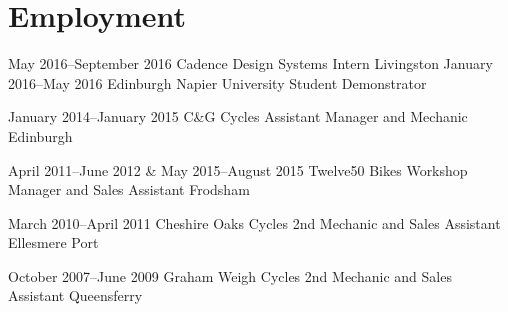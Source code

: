 \documentclass{moderncv}
\begin{document}
\section{Employment}
	\cventry
		{}
		{May 2016--September 2016}
		{Cadence Design Systems}
		{Intern}
		{Livingston}
		{
		}
	\cventry
		{}
		{January 2016--May 2016}
		{Edinburgh Napier University}
		{Student Demonstrator}
		{}
		{}
		\begin{comment}

			\cvlistitem{2nd year Mobile Applications Development}
			\cvlistitem{Assisting lecturer during practical sessions}
			\cvlistitem{Answering questions from students related to mobile programming}
			\cvlistitem{Presented during lecture on previous year's coursework}
		}
		\end{comment}
	\cventry
		{}
		{January 2014--January 2015}
		{C\&G Cycles}
		{Assistant Manager and Mechanic}
		{Edinburgh}
		{}
		\begin{comment}
			\cvlistitem{Assembling high end custom road bikes}
			\cvlistitem{Setting up, updating, and customising electronic gear systems}
			\cvlistitem{Attending trade shows and manufacturers events}
		\end{comment}
	\cventry
		{}
		{April 2011--June 2012 \& May 2015--August 2015}
		{Twelve50 Bikes}
		{Workshop Manager and Sales Assistant}
		{Frodsham}
		{}
		\begin{comment}
			\cvlistitem{Repairs}
			\cvlistitem{New builds}
			\cvlistitem{Assembling high end custom road and mountain bikes}
			\cvlistitem{Maintaining stock of workshop supplies}
			\cvlistitem{Assembling and maintaining race bike fleet}
			\cvlistitem{All aspects of sales}
		\end{comment}
	\cventry
		{}
		{March 2010--April 2011}
		{Cheshire Oaks Cycles}
		{2nd Mechanic and Sales Assistant}
		{Ellesmere Port}
		{}
		\begin{comment}
			Same as previous, including:\\
			\cvlistitem{Creating various graphics including price tags and shop jerseys}
			\cvlistitem{Stock processing}
		\end{comment}		
	\cventry
		{}
		{October 2007--June 2009}
		{Graham Weigh Cycles}
		{2nd Mechanic and Sales Assistant}
		{Queensferry}
		{}
			\begin{comment}
			\cvlistitem{Repairs}
			\cvlistitem{New Builds}
			\cvlistitem{Refurbishing and selling second hand cycles}
			\cvlistitem{Building custom road bikes}
			\cvlistitem{All aspects of sales}
			\cvlistitem{General shop cleaning and maintenance}	
		}		
			\end{comment}
\end{document}
